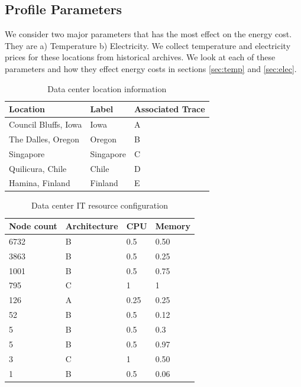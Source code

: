 \documentclass[conference,12pt]{IEEEtran}
\begin{document}
\subsection{Profile Parameters}
We consider two major parameters that has the most effect on the energy cost. They are a) Temperature b) Electricity. We collect temperature and electricity prices for these locations from historical archives. We look at each of these parameters and how they effect energy costs in sections \ref{sec:temp} and \ref{sec:elec}.

\begin{table}[] 
 \centering
\begin{tabular}{|p{3cm}|l|p{2.5cm}|}
\hline
\bf{Location}                        & \bf{Label} & \bf{Associated Trace} \\ \hline
Council Bluffs, Iowa & Iowa   &  A               \\ \hline
The Dalles, Oregon          & Oregon   & B                \\ \hline
Singapore                       & Singapore   & C                \\ \hline
Quilicura, Chile                & Chile   & D                \\ \hline
Hamina, Finland                 & Finland   &   E               \\ \hline
\end{tabular}
\caption {Data center location information} \label{tab:dc}
\end{table}



\begin{table}[] 
 \centering
\begin{tabular}{|l|l|l|l|}
\hline
\bf{Node count}      &       \bf{Architecture}          & \bf{CPU} & \bf{Memory} \\ \hline
6732 & B & 0.5 & 0.50   \\ \hline
3863 & B & 0.5 & 0.25   \\ \hline
1001 & B & 0.5 & 0.75   \\ \hline
795 & C & 1 & 1   \\ \hline
126 & A & 0.25 & 0.25   \\ \hline
52 & B & 0.5 & 0.12  \\ \hline
5 & B & 0.5 & 0.3  \\ \hline
5 & B & 0.5 & 0.97  \\ \hline
3 & C & 1 & 0.50  \\ \hline
1 & B & 0.5 & 0.06  \\ \hline
\end{tabular}
\caption {Data center IT resource configuration} \label{tab:dcres}
\end{table}
\end{document}
